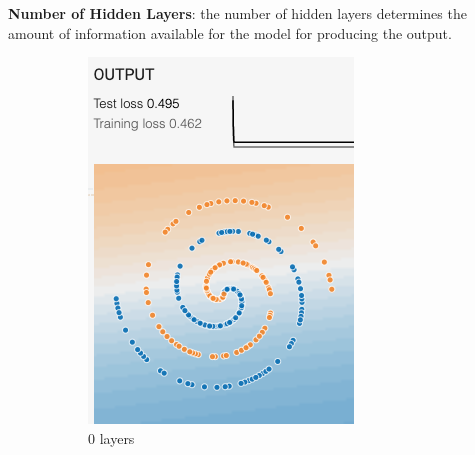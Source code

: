 \documentclass[12pt,a4paper]{article}
\begin{document}
\begin{enumerate}
		\noindent \textbf{\small Number of Hidden Layers}: the number of hidden layers determines the amount of information available for the model for producing the output. 
		\begin{figure}[H]
			\centering
			\begin{subfigure}[H]{0.2\textwidth}
				\centering
				\includegraphics[width=\textwidth]{Figures/hidden/0}
				\caption{0 layers}
			\end{subfigure}
			\begin{subfigure}[H]{0.2\textwidth}
				\centering

\end{subfigure}
\end{figure}
\end{enumerate}
\end{document}
